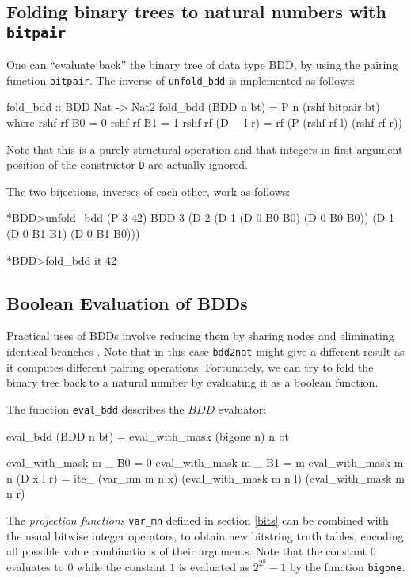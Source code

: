\documentclass[]{INCLUDES/llncs}
\begin{document}
\subsection{Folding binary trees to natural numbers with {\tt bitpair}}
One can ``evaluate back'' the binary tree of data type BDD,
by using the pairing function {\tt bitpair}.  
The inverse of {\tt unfold\_bdd} is implemented as follows:
\begin{code}
fold_bdd :: BDD Nat -> Nat2
fold_bdd (BDD n bt) = 
  P n (rshf bitpair bt) where
    rshf rf B0 = 0
    rshf rf B1 = 1
    rshf rf (D _ l r) = 
      rf (P (rshf rf l) (rshf rf r))
\end{code}
Note that this is a purely structural operation
and that integers in first argument position
of the constructor {\tt D} are actually ignored.

The two bijections, inverses of each other, work as follows:
\begin{codex}
*BDD>unfold_bdd (P 3 42)
  BDD 3 
    (D 2 
      (D 1 (D 0 B0 B0) 
           (D 0 B0 B0)) 
      (D 1 (D 0 B1 B1) 
           (D 0 B1 B0)))

*BDD>fold_bdd it
  42
\end{codex}

\subsection{Boolean Evaluation of BDDs}
Practical uses of BDDs involve reducing them by
sharing nodes and eliminating identical
branches \cite{bryant86graphbased}.
Note that in this case {\tt bdd2nat} 
might give a different result as it computes
different pairing operations. 
Fortunately,
we can try to fold the binary tree 
back to a natural number
by evaluating it as a boolean
function.

The function {\tt eval\_bdd} describes the $BDD$ evaluator:
\begin{code}
eval_bdd (BDD n bt) = eval_with_mask (bigone n) n bt
 
eval_with_mask m _ B0 = 0 
eval_with_mask m _ B1 = m
eval_with_mask m n (D x l r) = 
  ite_ (var_mn m n x) 
         (eval_with_mask m n l) 
         (eval_with_mask m n r) 
\end{code}

The {\em projection functions} {\tt var\_mn} defined in section \ref{bits}
can be combined with the usual bitwise integer operators, 
to obtain new bitstring truth tables, 
encoding all possible value combinations of their arguments.
Note that the constant $0$ evaluates to $0$ while the constant $1$
is evaluated as $2^{2^n}-1$ by the function {\tt bigone}.
\end{document}
